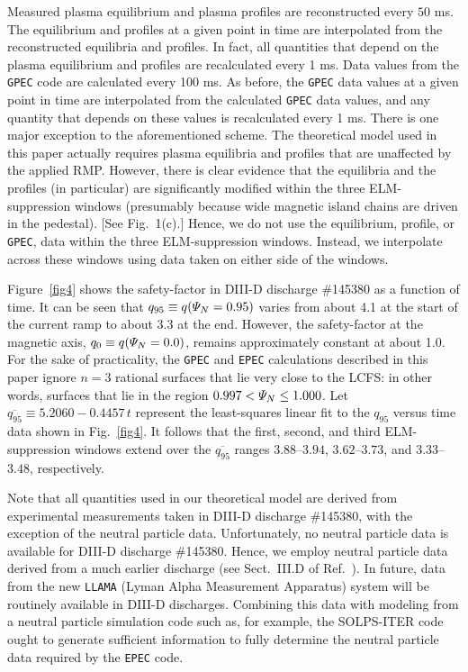 \documentclass[12pt,prb,aps]{revtex4-1}
\begin{document}
Measured plasma equilibrium and
plasma profiles are reconstructed every $50$ ms. The equilibrium and profiles  at a given point in time are interpolated from
the reconstructed equilibria and profiles. In fact, all quantities that depend on the plasma equilibrium and profiles are recalculated every 1 ms.  Data values from the
{\tt GPEC} code are calculated every 100 ms. As before, the {\tt GPEC} data values at a given point in time are interpolated from the
calculated {\tt GPEC} data values, and any quantity that depends on these values is recalculated every 1 ms. There is one major exception to
the aforementioned scheme. The theoretical model used in this paper actually requires plasma equilibria and profiles that are unaffected
by the applied RMP. However, there is clear evidence that the equilibria and the profiles (in particular) are significantly modified
within the three ELM-suppression windows (presumably because wide magnetic island chains are driven in the pedestal). [See Fig.~1(c).]
Hence, we do not use the equilibrium, profile, or {\tt GPEC}, data within the three ELM-suppression windows. Instead, we
interpolate across these windows using data taken on either side of the windows. 

Figure~\ref{fig4} shows the safety-factor in DIII-D discharge \#145380 as a function of time. It can be seen
that $q_{95}\equiv q({\mit\Psi}_N=0.95)$ varies from about 4.1 at the start of the current ramp to about 3.3
at the end. However, the safety-factor at the magnetic axis, $q_0 \equiv q({\mit\Psi}_N=0.0)$, remains approximately
constant at about 1.0. For the sake of practicality,  the {\tt GPEC} and {\tt EPEC} calculations described in this paper ignore $n=3$ rational
surfaces that lie very close to the LCFS: in other words,  surfaces that lie in the region $0.997 < {\mit\Psi}_N\leq 1.000$. Let $\overline{q_{95}}\equiv 5.2060-0.4457\,t$ represent the
least-squares linear fit to the $q_{95}$ versus time data shown in Fig.~\ref{fig4}. 
It follows that the 
first, second, and third ELM-suppression windows extend over the $\overline{q_{95}}$ ranges $3.88$--$3.94$, $3.62$--$3.73$,
and $3.33$--$3.48$, respectively. 

Note that all quantities used in our theoretical model are derived from experimental measurements taken in DIII-D discharge \#145380, with the exception of the neutral particle data. 
Unfortunately, no neutral particle data is available for DIII-D discharge \#145380.
Hence, we employ neutral particle data derived from a much earlier discharge (see Sect.~III.D of Ref.~).\cite{neutral}
In future, data from the new {\tt LLAMA} (Lyman Alpha Measurement Apparatus) system will be routinely available in DIII-D discharges.\cite{llama}
Combining this data  with modeling from a neutral particle simulation code such as, for example, the  SOLPS-ITER code\,\cite{solps} ought to generate sufficient information to fully determine the
neutral particle data required by the {\tt EPEC} code.  
\end{document}
